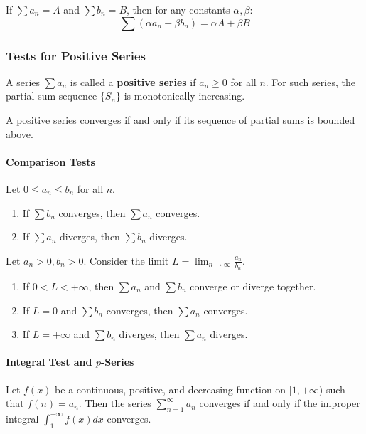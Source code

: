 \documentclass[oneside]{book}
\begin{document}
\begin{property}[Linearity]
If $\sum a_n = A$ and $\sum b_n = B$, then for any constants $\alpha, \beta$:
\[ \sum (\alpha a_n + \beta b_n) = \alpha A + \beta B \]
\end{property}

\subsubsection{Tests for Positive Series}

A series $\sum a_n$ is called a \textbf{positive series} if $a_n \ge 0$ for all $n$.
For such series, the partial sum sequence $\{S_n\}$ is monotonically increasing.
\begin{theorem}
A positive series converges if and only if its sequence of partial sums is bounded above.
\end{theorem}

\paragraph{Comparison Tests}
\begin{theorem}
Let $0 \le a_n \le b_n$ for all $n$.
\begin{enumerate}
    \item If $\sum b_n$ converges, then $\sum a_n$ converges.
    \item If $\sum a_n$ diverges, then $\sum b_n$ diverges.
\end{enumerate}
\end{theorem}

\begin{theorem}
Let $a_n > 0, b_n > 0$. Consider the limit $L = \lim_{n \to \infty} \frac{a_n}{b_n}$.
\begin{enumerate}
    \item If $0 < L < +\infty$, then $\sum a_n$ and $\sum b_n$ converge or diverge together.
    \item If $L = 0$ and $\sum b_n$ converges, then $\sum a_n$ converges.
    \item If $L = +\infty$ and $\sum b_n$ diverges, then $\sum a_n$ diverges.
\end{enumerate}
\end{theorem}

\paragraph{Integral Test and $p$-Series}
\begin{theorem}
Let $f(x)$ be a continuous, positive, and decreasing function on $[1, +\infty)$ such that $f(n) = a_n$. Then the series $\sum_{n=1}^{\infty} a_n$ converges if and only if the improper integral $\int_1^{+\infty} f(x) dx$ converges.
\end{theorem}
\end{document}
